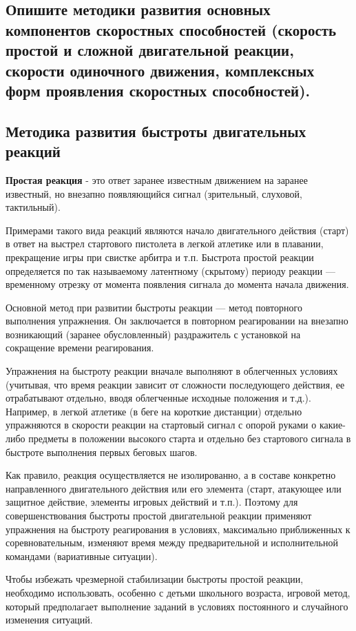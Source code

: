 \subsection{Опишите методики развития основных компонентов скоростных способностей (скорость простой и сложной двигательной реакции, скорости одиночного движения, комплексных форм проявления скоростных способностей).}

\subsection*{Методика развития быстроты двигательных реакций}

\textbf{Простая реакция} - это ответ заранее известным движением на заранее известный, но внезапно появляющийся сигнал
(зрительный, слуховой, тактильный).

Примерами такого вида реакций являются начало двигательного действия (старт) в ответ на выстрел стартового пистолета в
легкой атлетике или в плавании, прекращение игры при свистке арбитра и т.п. Быстрота простой реакции определяется по так
называемому латентному (скрытому) периоду реакции — временному отрезку от момента появления сигнала до момента начала движения.

Основной метод при развитии быстроты реакции — метод повторного выполнения упражнения. Он заключается в повторном реагировании
на внезапно возникающий (заранее обусловленный) раздражитель с установкой на сокращение времени реагирования.

Упражнения на быстроту реакции вначале выполняют в облегченных условиях (учитывая, что время реакции зависит от сложности
последующего действия, ее отрабатывают отдельно, вводя облегченные исходные положения и т.д.). Например, в легкой атлетике
(в беге на короткие дистанции) отдельно упражняются в скорости реакции на стартовый сигнал с опорой руками о какие-либо предметы
в положении высокого старта и отдельно без стартового сигнала в быстроте выполнения первых беговых шагов.

Как правило, реакция осуществляется не изолированно, а в составе конкретно направленного двигательного действия или его элемента
(старт, атакующее или защитное действие, элементы игровых действий и т.п.). Поэтому для совершенствования быстроты
простой двигательной реакции применяют упражнения на быстроту реагирования в условиях, максимально приближенных к
соревновательным, изменяют время между предварительной и исполнительной командами (вариативные ситуации).

Чтобы избежать чрезмерной стабилизации быстроты простой реакции, необходимо использовать, особенно с детьми школьного возраста,
игровой метод, который предполагает выполнение заданий в условиях постоянного и случайного изменения ситуаций.

